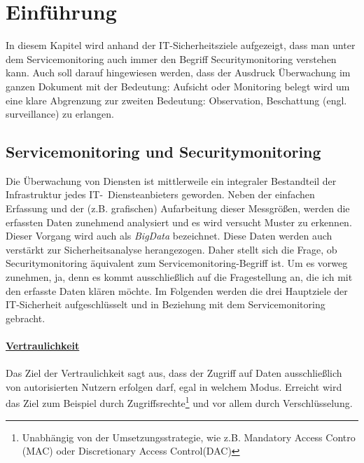 \chapter{Einführung}\label{01_einf}
\thispagestyle{fancy}

In diesem Kapitel wird anhand der IT-Sicherheitsziele aufgezeigt, dass man unter dem
Servicemonitoring auch immer den Begriff Securitymonitoring verstehen
kann. Auch soll darauf hingewiesen werden, dass der Ausdruck Überwachung im ganzen
Dokument mit der Bedeutung: Aufsicht oder Monitoring belegt wird um eine klare Abgrenzung
zur zweiten Bedeutung: Observation, Beschattung (engl. surveillance) zu erlangen.


\section{Servicemonitoring und Securitymonitoring}

Die Überwachung von Diensten ist mittlerweile ein integraler Bestandteil der 
Infrastruktur jedes IT-~Diensteanbieters geworden. Neben der einfachen Erfassung
und der (z.B. grafischen) Aufarbeitung dieser Messgrößen, werden die erfassten Daten
zunehmend analysiert und es wird versucht Muster zu erkennen. Dieser Vorgang wird auch
als \textit{BigData} bezeichnet. Diese Daten werden auch verstärkt zur Sicherheitsanalyse
herangezogen. Daher stellt sich die Frage, ob Securitymonitoring äquivalent zum
Servicemonitoring-Begriff ist. Um es vorweg zunehmen, ja, denn es kommt ausschließlich auf
die Fragestellung an, die ich mit den erfasste Daten klären möchte. Im Folgenden werden 
die drei Hauptziele der IT-Sicherheit aufgeschlüsselt und in Beziehung mit dem 
Servicemonitoring gebracht.\\\\

\underline{\textbf{Vertraulichkeit}}\\\\
Das Ziel der Vertraulichkeit sagt aus, dass der Zugriff auf Daten ausschließlich von
autorisierten Nutzern erfolgen darf, egal in welchem Modus. Erreicht wird das Ziel zum
Beispiel durch Zugriffsrechte\footnote{Unabhängig von der Umsetzungsstrategie, wie z.B. 
Mandatory Access Contro (MAC) oder Discretionary Access Control(DAC)} und vor allem 
durch 
Verschlüsselung.\\

